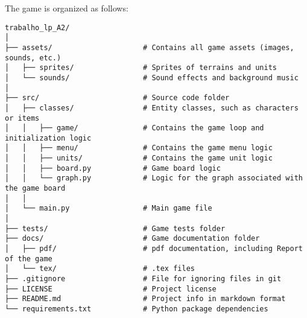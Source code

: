 The game is organized as follows:

\begin{verbatim}
trabalho_lp_A2/
│
├── assets/                     # Contains all game assets (images, sounds, etc.)
│   ├── sprites/                # Sprites of terrains and units
│   └── sounds/                 # Sound effects and background music
│
├── src/                        # Source code folder
│   ├── classes/                # Entity classes, such as characters or items
│   │   ├── game/               # Contains the game loop and initialization logic
│   │   ├── menu/               # Contains the game menu logic
│   │   ├── units/              # Contains the game unit logic
│   │   ├── board.py            # Game board logic
│   │   └── graph.py            # Logic for the graph associated with the game board
│   │
│   └── main.py                 # Main game file
│
├── tests/                      # Game tests folder
├── docs/                       # Game documentation folder
│   ├── pdf/                    # pdf documentation, including Report of the game
│   └── tex/                    # .tex files
├── .gitignore                  # File for ignoring files in git
├── LICENSE                     # Project license
├── README.md                   # Project info in markdown format
└── requirements.txt            # Python package dependencies
\end{verbatim}
